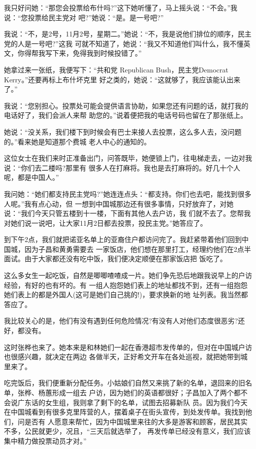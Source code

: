 ﻿\documentclass[11pt]{article}
\begin{document}
我只好问她：``那您会投票给布什吗?''这下她听懂了，马上摇头说：``不会。''我说：``您投票给民主党对
吧?''她说：``是。是一号吧?''

我说：``不，是2号，11月2号，星期二。''她说：``不，我是说他们排位的顺序，民主党的人是一号吧?''这我
可就不知道了，她说：``我又不知道他们叫什么，我不懂英文，你得帮我写下来，免得我到时候投错了。''

她拿过来一张纸，我便写下：``共和党 Republican Bush，民主党Democrat Kerry。''还要再标上布什坏克里
好之类的，她说：``这就够了，我应该能认出来了。''

我说：``您别担心。投票处可能会提供语言协助，如果您还有问题的话，就打我的电话好了，我们会派人来帮
助您的。''说着便把我的电话号码也留在了那张纸上。

她说：``没关系，我们楼下到时候会有巴士来接人去投票，这么多人去，没问题的。''看来她是知道那个费城
老人中心的通知的。

这位女士在我们来时正准备出门，问答既毕，她便锁上门，往电梯走去，一边对我说：``你们去二楼吗?那里有
很多人在打麻将。我也是去打麻将的。好几十个人呢，都是中国人。''

我问她：``她们都支持民主党吗?''她连连点头：``都支持。你们也去吧，能找到很多人呢。''我有点心动，但
一想到中国城那边还有很多事情，只好放弃了，对她说：``我们今天只管五楼到十一楼，下面有其他人去户访，我
们就不去了。您帮我对她们说一说吧，让大家11月2日都去投票，投民主党。''她答应了。


到下午2点，我们就把诺亚名单上的亚裔住户都访问完了。我赶紧带着他们回到中国城，因为子昌和黄勇需要去
一家饭店，他们想在那里打工，经理约他们在2点半面试。由于大家都还没有吃中饭，我们便决定顺便在那家饭店把
饭吃了。

这么多女生一起吃饭，自然是唧唧喳喳成一片。她们争先恐后地跟我说早上的户访经验，有好的也有坏的。有
一组人抱怨她们表上的地址都找不到，还有一组抱怨她们表上的都是外国人(这可是她们自己挑的!)，要求换新的地
址列表。我当然都答应了。

我比较关心的是，他们有没有遇到任何危险情况?有没有人对他们态度很恶劣?还好，都没有。

这时张桦也来了。她本来是和林她们一起在香港超市发传单的，但对在中国城户访也很感兴趣，就决定在两边
各做半天，正好希文开车在各处巡视，就把她带到城里来了。

吃完饭后，我们便重新分配任务。小姑娘们自然又来挑了新的名单，退回来的旧名单，张桦、杨蕙形成一组去
户访，因为她们的英语都很好；子昌加入了两个都不会说广东话的女生组，我则拿了剩下的名单，试图去招募新队
员。因为我们今天在中国城看到有很多克里阵营的人，摆着桌子在街头宣传，到处发传单。我找到他们，问是否有
人愿意来帮忙，因为中国城里来往的大多是游客和顾客，居民其实不多，公民就更少，况且，``三天后就选举了，
再发传单已经没有意义，我们应该集中精力做投票动员才对。''
\end{document}
